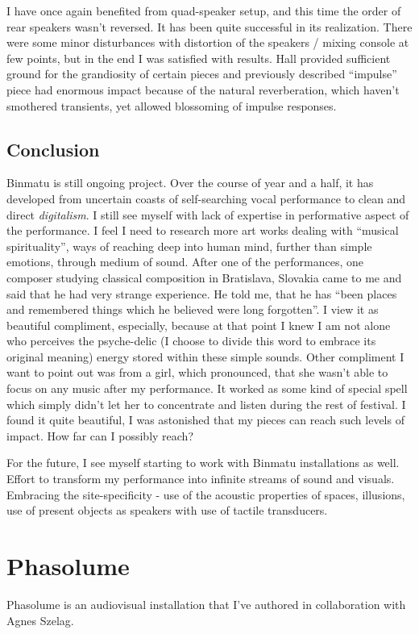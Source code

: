 \documentclass[11pt,a4paper,oneside]{report}
\begin{document}
I have once again benefited from quad-speaker setup, and this time the order of rear speakers wasn't reversed. It has been quite successful in its realization. There were some minor disturbances with distortion of the speakers / mixing console at few points, but in the end I was satisfied with results. Hall provided sufficient ground for the grandiosity of certain pieces and previously described ``impulse'' piece had enormous impact because of the natural reverberation, which haven't smothered transients, yet allowed blossoming of impulse responses.

\subsection{Conclusion} Binmatu is still ongoing project. Over the course of year and a half, it has developed from uncertain coasts of self-searching vocal performance to clean and direct \emph{digitalism}. I still see myself with lack of expertise in performative aspect of the performance. I feel I need to research more art works dealing with ``musical spirituality'', ways of reaching deep into human mind, further than simple emotions, through medium of sound. After one of the performances, one composer studying classical composition in Bratislava, Slovakia came to me and said that he had very strange experience. He told me, that he has ``been places and remembered things which he believed were long forgotten''. I view it as beautiful compliment, especially, because at that point I knew I am not alone who perceives the psyche-delic (I choose to divide this word to embrace its original meaning) energy stored within these simple sounds. Other compliment I want to point out was from a girl, which pronounced, that she wasn't able to focus on any music after my performance. It worked as some kind of special spell which simply didn't let her to concentrate and listen during the rest of festival. I found it quite beautiful, I was astonished that my pieces can reach such levels of impact. How far can I possibly reach?

For the future, I see myself starting to work with Binmatu installations as well. Effort to transform my performance into infinite streams of sound and visuals. Embracing the site-specificity - use of the acoustic properties of spaces, illusions, use of present objects as speakers with use of tactile transducers.

\section{Phasolume} Phasolume is an audiovisual installation that I've authored in collaboration with Agnes Szelag.
\end{document}
